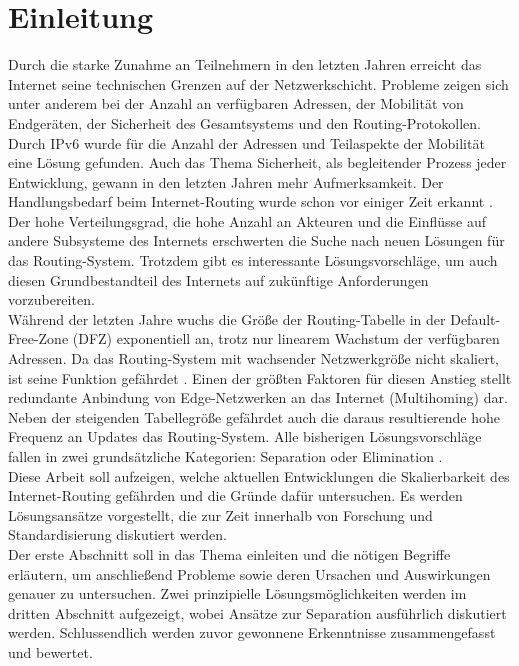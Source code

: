 \section{Einleitung}
Durch die starke Zunahme an Teilnehmern in den letzten Jahren erreicht das Internet seine technischen Grenzen auf der Netzwerkschicht. Probleme zeigen sich unter anderem bei der Anzahl an verfügbaren Adressen, der Mobilität von Endgeräten, der Sicherheit des Gesamtsystems und den Routing-Protokollen. Durch IPv6 wurde für die Anzahl der Adressen und Teilaspekte der Mobilität eine Lösung gefunden. Auch das Thema Sicherheit, als begleitender Prozess jeder Entwicklung, gewann in den letzten Jahren mehr Aufmerksamkeit. Der Handlungsbedarf beim Internet-Routing wurde schon vor einiger Zeit erkannt \cite{deering:1996:map}. Der hohe Verteilungsgrad, die hohe Anzahl an Akteuren und die Einflüsse auf andere Subsysteme des Internets erschwerten die Suche nach neuen Lösungen für das Routing-System. Trotzdem gibt es interessante Lösungsvorschläge, um auch diesen Grundbestandteil des Internets auf zukünftige Anforderungen vorzubereiten. \\
 
Während der letzten Jahre wuchs die Größe der Routing-Tabelle in der Default-Free-Zone (DFZ) exponentiell an, trotz nur linearem Wachstum der verfügbaren Adressen\cite{huston:2001:analyzing}. Da das Routing-System mit wachsender Netzwerkgröße nicht skaliert, ist seine Funktion gefährdet \cite{jen:2008:start}. Einen der größten Faktoren für diesen Anstieg stellt redundante Anbindung von Edge-Netzwerken an das Internet (Multihoming) dar. Neben der steigenden Tabellegröße gefährdet auch die daraus resultierende hohe Frequenz an Updates das Routing-System. Alle bisherigen Lösungsvorschläge fallen in zwei grundsätzliche Kategorien: Separation oder Elimination \cite{jen:2008:start}. \\

Diese Arbeit soll aufzeigen, welche aktuellen Entwicklungen die Skalierbarkeit des Internet-Routing gefährden und die Gründe dafür untersuchen. Es werden Lösungsansätze vorgestellt, die zur Zeit innerhalb von Forschung und Standardisierung diskutiert werden. \\

Der erste Abschnitt soll in das Thema einleiten und die nötigen Begriffe erläutern, um anschließend Probleme sowie deren Ursachen und Auswirkungen genauer zu untersuchen. Zwei prinzipielle Lösungsmöglichkeiten werden im dritten Abschnitt aufgezeigt, wobei Ansätze zur Separation ausführlich diskutiert werden. Schlussendlich werden zuvor gewonnene Erkenntnisse zusammengefasst und bewertet.

 
